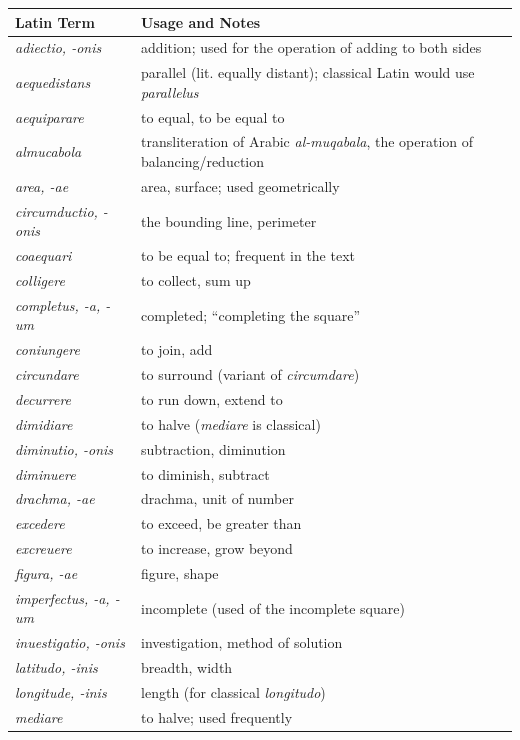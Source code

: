 \documentclass[11pt,a4paper,twoside]{book}
\begin{document}
\begin{longtable}{p{}p{}}
\toprule
\textbf{Latin Term} & \textbf{Usage and Notes} \\
\midrule
\endhead
\textit{adiectio, -onis} & addition; used for the operation of adding to both sides \\
\textit{aequedistans} & parallel (lit. equally distant); classical Latin would use \textit{parallelus} \\
\textit{aequiparare} & to equal, to be equal to \\
\textit{almucabola} & transliteration of Arabic \textit{al-muqabala}, the operation of balancing/reduction \\
\textit{area, -ae} & area, surface; used geometrically \\
\textit{circumductio, -onis} & the bounding line, perimeter \\
\textit{coaequari} & to be equal to; frequent in the text \\
\textit{colligere} & to collect, sum up \\
\textit{completus, -a, -um} & completed; ``completing the square'' \\
\textit{coniungere} & to join, add \\
\textit{circundare} & to surround (variant of \textit{circumdare}) \\
\textit{decurrere} & to run down, extend to \\
\textit{dimidiare} & to halve (\textit{mediare} is classical) \\
\textit{diminutio, -onis} & subtraction, diminution \\
\textit{diminuere} & to diminish, subtract \\
\textit{drachma, -ae} & drachma, unit of number \\
\textit{excedere} & to exceed, be greater than \\
\textit{excreuere} & to increase, grow beyond \\
\textit{figura, -ae} & figure, shape \\
\textit{imperfectus, -a, -um} & incomplete (used of the incomplete square) \\
\textit{inuestigatio, -onis} & investigation, method of solution \\
\textit{latitudo, -inis} & breadth, width \\
\textit{longitude, -inis} & length (for classical \textit{longitudo}) \\
\textit{mediare} & to halve; used frequently \\

\end{longtable}
\end{document}

